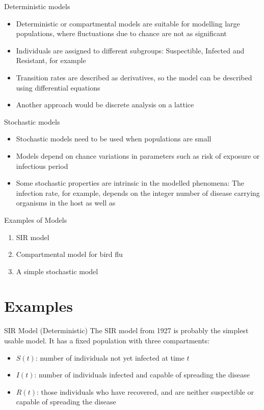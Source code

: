 \documentclass{beamer}
\begin{document}
\begin{frame}{Deterministic models}
\begin{itemize}
\item Deterministic or compartmental models are suitable for modelling large populations, where fluctuations due to chance are not as significant
\item Individuals are assigned to different subgroups: Suspectible, Infected and Resistant, for example
\item Transition rates are described as derivatives, so the model can be described using differential equations
\item Another approach would be discrete analysis on a lattice
\end{itemize}
\end{frame}


\begin{frame}{Stochastic models}
\begin{itemize}
\item Stochastic models need to be used when populations are small
\item Models depend on chance variations in parameters such as risk of exposure or infectious period
\item Some stochastic properties are intrinsic in the modelled phenomena: The infection rate, for example, depends on the integer number of disease carrying organisms in the host as well as
\end{itemize}
\end{frame}

\begin{frame}{Examples of Models}
\begin{enumerate}
\item SIR model
\item Compartmental model for bird flu
\item A simple stochastic model
\end{enumerate}
\end{frame}

\section{Examples}
\begin{frame}{SIR Model (Deterministic)}
The SIR model from 1927 is probably the simplest usable model. It has a fixed population with three compartments:
\begin{itemize}
\item $S(t)$: number of individuals not yet infected at time $t$
\item $I(t)$: number of individuals infected and capable of spreading the disease
\item $R(t)$: those individuals who have recovered, and are neither suspectible or capable of spreading the disease
\end{itemize}
\end{frame}
\end{document}
